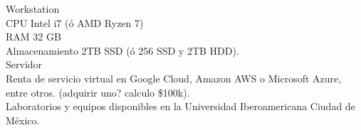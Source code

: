 Workstation\\
CPU Intel i7 (ó AMD Ryzen 7)\\
RAM 32 GB\\
Almacenamiento 2TB SSD (ó 256 SSD y 2TB HDD).\\

Servidor\\
Renta de servicio virtual en Google Cloud, Amazon AWS o Microsoft Azure, entre otros. (adquirir uno? calculo \$100k).\\

Laboratorios y equipos disponibles en la Universidad Iberoamericana Ciudad de México.\\